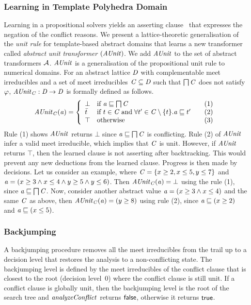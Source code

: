 \subsubsection{Learning in Template Polyhedra Domain}
%
Learning in a propositional solvers yields an asserting
clause~\cite{cdcl} that expresses the negation of the conflict
reasons.  We present a lattice-theoretic generalisation of the 
{\em unit rule} for template-based abstract domains that learns a new 
transformer called {\em abstract unit transformer} $(\mathit{AUnit})$.    
We add $\mathit{AUnit}$ to the set of abstract transformers $\mathcal{A}$. 
$\mathit{AUnit}$ is a generalisation of the propositional unit rule to
numerical domains.  For an abstract lattice $\mathit{D}$ with
complementable meet irreducibles and a set of meet irreducibles $\mathit{C}
\subseteq \mathit{D}$ such that $\bigsqcap
\mathit{C}$ does not satisfy $\varphi$, $\mathit{AUnit}_{\mathit{C}}: \mathit{D} \rightarrow
\mathit{D}$ is formally defined as follows.
\[ \aunit_\conflictset(\absval) =
 \left\{\begin{array}{l@{\quad}l@{\qquad}l}
  \bot       & \text{if } \absval \sqsubseteq \bigsqcap \conflictset & (1)\\
  \bar{t}    & \text{if } t \in \conflictset \; \text{and} \; \forall t' \in \conflictset
  \setminus \{t\}. \absval  \sqsubseteq t' & (2) \\
  \top & \text{otherwise} & (3) \\
 \end{array}\right.
\]
Rule (1) shows $\mathit{AUnit}$ returns $\bot$ since 
$\mathit{a} \sqsubseteq \bigsqcap \mathit{C}$ is conflicting.  
Rule (2) of $\mathit{AUnit}$ infer a valid meet irreducible, 
which implies that $\mathit{C}$ is unit.  However, if 
$\mathit{AUnit}$ returns $\top$, then the learned clause is not 
asserting after backtracking.  This would prevent any new 
deductions from the learned clause. Progress is then made by decisions.
%
Let us consider an example, where $\mathit{C} = \{x \geq 2, x \leq 5, y
\leq 7 \}$ and $\mathit{a} = (x \geq 3\wedge\allowbreak x \leq
4\wedge\allowbreak y \geq 5\wedge y \leq 6)$.  Then
$\mathit{AUnit}_{\mathit{C}}(\mathit{a}) = \bot$ using the rule (1), since $\mathit{a}
\sqsubseteq \bigsqcap\mathit{C}$.  Now, consider another abstract value
$\mathit{a} = (x \geq 3\wedge x \leq 4)$ and the same $\mathit{C}$ as above,
then $\mathit{AUnit}_{\mathit{C}}(\mathit{a}) = (y \geq 8)$ using rule (2), since
$\mathit{a} \sqsubseteq (x \geq 2)$ and $\mathit{a} \sqsubseteq (x \leq 5)$.  
%
\subsubsection{Backjumping}
A backjumping procedure removes all the meet irreducibles from 
the trail up to a decision level that restores the analysis to a
non-conflicting state.  The backjumping level is defined by the
meet irreducibles of the conflict clause that is closest 
to the root (decision level~0) where the conflict
clause is still unit.  If a conflict clause is globally unit, then the
backjumping level is the root of the search tree and
$\mathit{analyzeConflict}$ returns $\mathsf{false}$, otherwise it returns $\mathsf{true}$.
